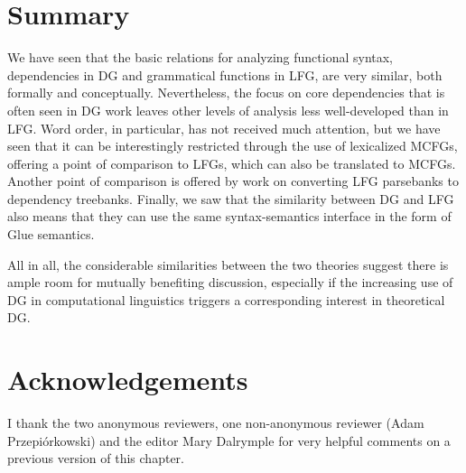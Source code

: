 \documentclass[output=paper,hidelinks]{langscibook}
\begin{document}
\section{Summary}
We have seen that the basic relations for analyzing functional syntax,
dependencies in DG and grammatical functions in LFG, are very similar,
both formally and conceptually. Nevertheless, the focus on core
dependencies that is often seen in DG work leaves other levels of
analysis less well-developed than in LFG. Word order, in particular,
has not received much attention, but we have seen that it can be
interestingly restricted through the use of lexicalized MCFGs,
offering a point of comparison to LFGs, which can also be translated
to MCFGs. Another point of comparison is offered by work on converting
LFG parsebanks to dependency treebanks. Finally, we saw that the
similarity between DG and LFG also means that they can use the same
syntax-semantics interface in the form of Glue semantics.

All in all, the considerable similarities between the two theories
suggest there is ample room for mutually benefiting discussion,
especially if the increasing use of DG in computational linguistics
triggers a corresponding interest in theoretical DG.

\section*{Acknowledgements}
I thank the two anonymous reviewers, one non-anonymous reviewer (Adam Przepiórkowski) and the editor Mary Dalrymple for very helpful comments on a previous version of this chapter.
 
\sloppy
\printbibliography[heading=subbibliography,notkeyword=this]
\end{document}
